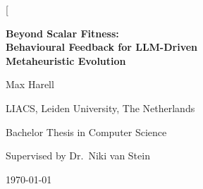 \documentclass[10pt,a4paper,twocolumn]{article}
\begin{document}
\twocolumn[{%
\begin{center}
\vspace*{0.2cm}
{\LARGE\bfseries Beyond Scalar Fitness:\\[0.3em]
Behavioural Feedback for LLM-Driven\\Metaheuristic Evolution\par}
\vspace{0.7cm}
{\large Max Harell\par}
\vspace{0.15cm}
{\small LIACS, Leiden University, The Netherlands\par}
\vspace{0.5cm}
{\small Bachelor Thesis in Computer Science\par}
{\small Supervised by Dr.\ Niki van Stein\par}
\vspace{0.15cm}
{\small \today\par}
\vspace{0.6cm}
\end{center}

}
\end{document}
